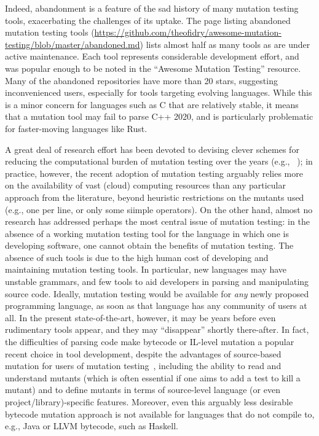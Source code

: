\documentclass[sigconf,review, anonymous]{acmart}
\begin{document}
Indeed, abandonment is a feature of the sad history
of many mutation testing tools, exacerbating the challenges of its uptake.  The page listing abandoned
mutation testing tools
(\url{https://github.com/theofidry/awesome-mutation-testing/blob/master/abandoned.md})
lists almost half as many tools as are under active maintenance. Each tool represents 
considerable development effort, and was
popular enough to be noted in the ``Awesome
Mutation Testing'' resource. Many of the abandoned repositories have more than
20 stars, suggesting inconvenienced users, especially for tools targeting
evolving languages. While this is a minor concern for languages such as C
that are relatively stable, it means that a mutation tool may fail
to parse C++ 2020, and is particularly problematic for 
faster-moving languages like Rust.

A great deal of research effort has been devoted to devising clever
schemes for reducing the computational burden of mutation testing over
the years (e.g., ~\cite{offutt2001mutation,
  untch1993mutation,KaufmanFAKAJ2022}); in practice, however, the recent adoption of mutation
testing arguably relies more on the availability of vast (cloud) computing
resources than any particular approach from the literature, beyond
heuristic restrictions on the mutants used (e.g., one per line, or
only some siimple operators).   On the other hand, almost no
research has addressed perhaps the most central issue of
mutation testing: in the absence of a working mutation testing
tool for the language in which one is developing software, one cannot
obtain the benefits of mutation testing.  The absence of such tools is
due to the high human cost of developing and maintaining mutation
testing tools.  In particular, new languages may have unstable
grammars, and few tools to aid developers in parsing and manipulating
source code.   Ideally, mutation testing would be available for
\emph{any} newly proposed programming language, as soon as that
language has any community of users at all.  In the present
state-of-the-art, however, it may be years before even rudimentary
tools appear, and they may ``disappear'' shortly there-after.  In
fact, the difficulties of parsing code make bytecode or IL-level
mutation a popular recent choice in tool development, despite the advantages of source-based mutation for
users of mutation testing~\cite{CompareSrcBinary}, including the
ability to read and understand mutants (which is often essential if
one aims to add a test to kill a mutant) and to define mutants in
terms of source-level language (or even project/library)-specific
features.  Moreover, even this arguably less desirable bytecode mutation
approach is not available for languages that do not compile to, e.g.,
Java or LLVM bytecode, such as Haskell.
\end{document}
